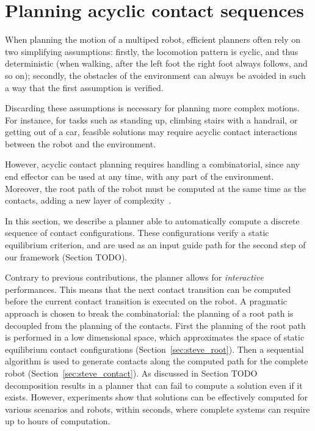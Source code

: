 \section{Planning acyclic contact sequences}
When planning the motion of a multiped robot, efficient
planners often rely on two simplifying assumptions:
firstly, the locomotion pattern is cyclic, and thus deterministic (when walking, after the left
foot the right foot always follows, and so on); secondly, the obstacles of the environment
can always be avoided in such a way that the first assumption is verified.

Discarding these assumptions is necessary for planning more complex motions.
For instance, for tasks such as standing up, climbing stairs
with a handrail, or getting out of a car, feasible solutions may require acyclic contact interactions between the robot and the environment.

However, acyclic contact planning requires 
handling a combinatorial, since any end effector can be used 
at any time, with any part of the environment. Moreover, the root path of the robot
must be computed at the same time as the contacts, adding a new layer of complexity~\citep{Bretl:2006:MPM:1124573.1124585, DBLP:conf/iser/EscandeKMG08}.

In this section, we describe a planner able to automatically compute 
a discrete sequence of contact configurations. These configurations verify a static equilibrium criterion,
and are used as an input guide path for the second step of our framework (Section TODO).

Contrary to previous contributions, the planner allows for \textit{interactive} performances.
This means that the next contact transition can be computed before the current contact transition
is executed on the robot. A pragmatic approach is chosen to break the combinatorial:
the planning of a root path is decoupled from the planning of the contacts.
First the planning of the root path is performed in a low dimensional space, which approximates 
the space of static equilibrium contact configurations (Section~\ref{sec:steve_root}).
Then a sequential algorithm is used to generate contacts along the computed path for the complete robot (Section~\ref{sec:steve_contact}).
As discussed in Section TODO decomposition results in a planner that can fail to compute a solution even if it exists.
However, experiments show that solutions can be effectively computed for various scenarios and robots, within seconds, where
complete systems can require up to hours of computation.


